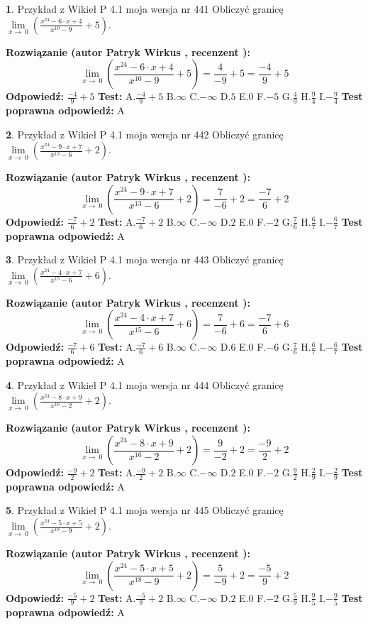 \documentclass[12pt, a4paper]{article}
\theoremstyle{definition} %
\newtheorem{zad}{}
\newcommand{\zadStart}[1]{\begin{zad}#1\newline}
\newcommand{\zadStop}{\end{zad}}
\newcommand{\rozwStart}[2]{\noindent \textbf{Rozwiązanie (autor #1 , recenzent #2): }\newline}
\newcommand{\rozwStop}{\newline}
\newcommand{\odpStart}{\noindent \textbf{Odpowiedź:}\newline}
\newcommand{\odpStop}{\newline}
\newcommand{\testStart}{\noindent \textbf{Test:}\newline}
\newcommand{\testStop}{\newline}
\newcommand{\kluczStart}{\noindent \textbf{Test poprawna odpowiedź:}\newline}
\newcommand{\kluczStop}{\newline}
\begin{document}
\zadStart{Przykład z Wikieł P 4.1 moja wersja nr 441}
Obliczyć granicę $\lim\limits_{x\to\ 0}(\frac{x^{24}-6 \cdot x +4}{x^{10}-9}+5)$.
\zadStop
\rozwStart{Patryk Wirkus}{}
$$\lim\limits_{x\to\ 0}(\frac{x^{24}-6 \cdot x +4}{x^{10}-9}+5)=\frac{4}{-9}+5=\frac{-4}{9}+5$$
\rozwStop
\odpStart
$\frac{-4}{9}+5$
\odpStop
\testStart
A.$\frac{-4}{9}+5$
B.$\infty$
C.$-\infty$
D.$5$
E.$0$
F.$-5$
G.$\frac{4}{9}$
H.$\frac{9}{4}$
I.$-\frac{9}{4}$
\testStop
\kluczStart
A
\kluczStop



\zadStart{Przykład z Wikieł P 4.1 moja wersja nr 442}
Obliczyć granicę $\lim\limits_{x\to\ 0}(\frac{x^{24}-9 \cdot x +7}{x^{13}-6}+2)$.
\zadStop
\rozwStart{Patryk Wirkus}{}
$$\lim\limits_{x\to\ 0}(\frac{x^{24}-9 \cdot x +7}{x^{13}-6}+2)=\frac{7}{-6}+2=\frac{-7}{6}+2$$
\rozwStop
\odpStart
$\frac{-7}{6}+2$
\odpStop
\testStart
A.$\frac{-7}{6}+2$
B.$\infty$
C.$-\infty$
D.$2$
E.$0$
F.$-2$
G.$\frac{7}{6}$
H.$\frac{6}{7}$
I.$-\frac{6}{7}$
\testStop
\kluczStart
A
\kluczStop



\zadStart{Przykład z Wikieł P 4.1 moja wersja nr 443}
Obliczyć granicę $\lim\limits_{x\to\ 0}(\frac{x^{24}-4 \cdot x +7}{x^{15}-6}+6)$.
\zadStop
\rozwStart{Patryk Wirkus}{}
$$\lim\limits_{x\to\ 0}(\frac{x^{24}-4 \cdot x +7}{x^{15}-6}+6)=\frac{7}{-6}+6=\frac{-7}{6}+6$$
\rozwStop
\odpStart
$\frac{-7}{6}+6$
\odpStop
\testStart
A.$\frac{-7}{6}+6$
B.$\infty$
C.$-\infty$
D.$6$
E.$0$
F.$-6$
G.$\frac{7}{6}$
H.$\frac{6}{7}$
I.$-\frac{6}{7}$
\testStop
\kluczStart
A
\kluczStop



\zadStart{Przykład z Wikieł P 4.1 moja wersja nr 444}
Obliczyć granicę $\lim\limits_{x\to\ 0}(\frac{x^{24}-8 \cdot x +9}{x^{16}-2}+2)$.
\zadStop
\rozwStart{Patryk Wirkus}{}
$$\lim\limits_{x\to\ 0}(\frac{x^{24}-8 \cdot x +9}{x^{16}-2}+2)=\frac{9}{-2}+2=\frac{-9}{2}+2$$
\rozwStop
\odpStart
$\frac{-9}{2}+2$
\odpStop
\testStart
A.$\frac{-9}{2}+2$
B.$\infty$
C.$-\infty$
D.$2$
E.$0$
F.$-2$
G.$\frac{9}{2}$
H.$\frac{2}{9}$
I.$-\frac{2}{9}$
\testStop
\kluczStart
A
\kluczStop



\zadStart{Przykład z Wikieł P 4.1 moja wersja nr 445}
Obliczyć granicę $\lim\limits_{x\to\ 0}(\frac{x^{24}-5 \cdot x +5}{x^{18}-9}+2)$.
\zadStop
\rozwStart{Patryk Wirkus}{}
$$\lim\limits_{x\to\ 0}(\frac{x^{24}-5 \cdot x +5}{x^{18}-9}+2)=\frac{5}{-9}+2=\frac{-5}{9}+2$$
\rozwStop
\odpStart
$\frac{-5}{9}+2$
\odpStop
\testStart
A.$\frac{-5}{9}+2$
B.$\infty$
C.$-\infty$
D.$2$
E.$0$
F.$-2$
G.$\frac{5}{9}$
H.$\frac{9}{5}$
I.$-\frac{9}{5}$
\testStop
\kluczStart
A
\kluczStop
\end{document}
